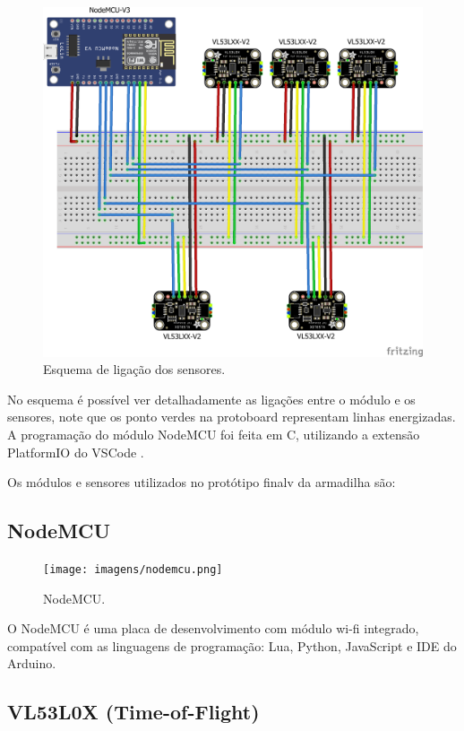 \documentclass[
	12pt,				%
	openright,			%
	oneside,			%
	a4paper,			%
	chapter=TITLE,		%
	english,			%
	brazil				%
	]{abntex2}
\begin{document}
\begin{figure}[H]
    \centering
    \includegraphics[scale=0.9]{imagens/EsquemaHardware.png}
    \caption{Esquema de ligação dos sensores.}
    \label{fig:esquemahardware}
\end{figure}   

No esquema é possível ver detalhadamente as ligações entre o módulo e os sensores, note que os ponto verdes na protoboard representam 
linhas energizadas. A programação do módulo NodeMCU foi feita em C, utilizando a extensão PlatformIO \cite{Platformio} do VSCode \cite{VSCode}. 

Os módulos e sensores utilizados no protótipo finalv da armadilha são:

\subsection{NodeMCU}

\begin{figure}[H]
\centering
\texttt{[image: imagens/nodemcu.png]}
\caption{NodeMCU.}
    \label{fig:nodemcu}
\end{figure}

O NodeMCU é uma placa de desenvolvimento com módulo wi-fi integrado, compatível com as linguagens de programação: Lua, Python, 
JavaScript e IDE do Arduino.

\subsection{VL53L0X (Time-of-Flight)}
\end{document}
